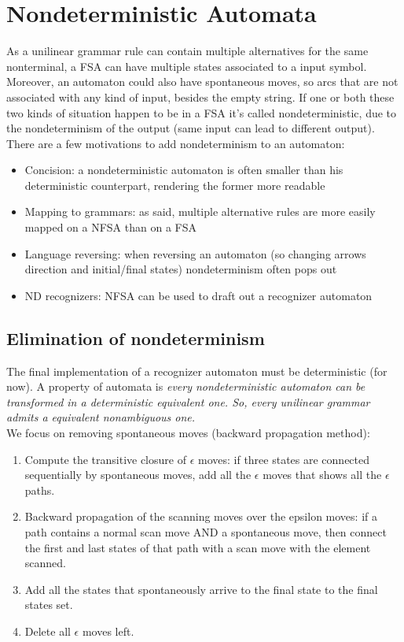 	\section{Nondeterministic Automata}
		As a unilinear grammar rule can contain multiple alternatives for the same nonterminal, a FSA can have multiple states associated to a input symbol. Moreover, an automaton could also have spontaneous moves, so arcs that are not associated with any kind of input, besides the empty string. If one or both these two kinds of situation happen to be in a FSA it's called nondeterministic, due to the nondeterminism of the output (same input can lead to different output).\\
		There are a few motivations to add nondeterminism to an automaton:
		\begin{itemize}
			\item Concision: a nondeterministic automaton is often smaller than his deterministic counterpart, rendering the former more readable
			\item Mapping to grammars: as said, multiple alternative rules are more easily mapped on a NFSA than on a FSA
			\item Language reversing: when reversing an automaton (so changing arrows direction and initial/final states) nondeterminism often pops out
			\item ND recognizers: NFSA can be used to draft out a recognizer automaton
		\end{itemize}
		\subsection{Elimination of nondeterminism}
			The final implementation of a recognizer automaton must be deterministic (for now). A property of automata is \emph{every nondeterministic automaton can be transformed in a deterministic equivalent one. So, every unilinear grammar admits a equivalent nonambiguous one.}\\
			We focus on removing spontaneous moves (backward propagation method):
			\begin{enumerate}
				\item Compute the transitive closure of $\epsilon$ moves: if three states are connected sequentially by spontaneous moves, add all the $\epsilon$ moves that shows all the $\epsilon$ paths.
				\item Backward propagation of the scanning moves over the epsilon moves: if a path contains a normal scan move AND a spontaneous move, then connect the first and last states of that path with a scan move with the element scanned.
				\item Add all the states that spontaneously arrive to the final state to the final states set.
				\item Delete all $\epsilon$ moves left.
			\end{enumerate}
		
